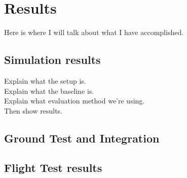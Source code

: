 \chapter{Results}

\par Here is where I will talk about what I have accomplished.
\section{Simulation results}
Explain what the setup is. \\
Explain what the baseline is.\\
Explain what evaluation method we're using. \\
Then show results.

\section{Ground Test and Integration}

\section{Flight Test results}